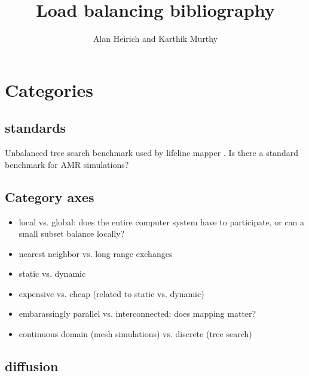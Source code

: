 \documentclass{article}
\begin{document}
\title{Load balancing bibliography}
\author{Alan Heirich and Karthik Murthy}

\maketitle

\section{Categories}

\subsection{standards}

Unbalanced tree search benchmark used by lifeline mapper
\cite{Saraswat:2011:LGL:1941553.1941582}.
Is there a standard benchmark for AMR simulations?

\subsection{Category axes}

\begin{itemize}
\item
local vs. global: does the entire computer system have to participate, or can a small subset balance locally?

\item
nearest neighbor vs. long range exchanges

\item 
static vs. dynamic

\item
expensive vs. cheap (related to static vs. dynamic)

\item
embarassingly parallel vs. interconnected: does mapping matter?

\item
continuous domain (mesh simulations) vs. discrete (tree search)

\end{itemize}


\subsection{diffusion}

\let\clearpage\relax
\end{document}
